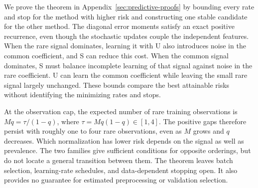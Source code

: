 We prove the theorem in Appendix~\ref{sec:predictive-proofs} by bounding every
rate and stop for the method with higher risk and constructing one stable
candidate for the other method. The diagonal error moments satisfy an exact
positive recurrence, even though the stochastic updates couple the independent
features. When the rare signal dominates, learning it with U also introduces
noise in the common coefficient, and S can reduce this cost. When the common
signal dominates, S must balance incomplete learning of that signal against
noise in the rare coefficient. U can learn the common coefficient while leaving
the small rare signal largely unchanged. These bounds compare the best
attainable risks without identifying the minimizing rates and stops.

At the observation cap, the expected number of rare training observations is
$Mq=\tau/(1-q)$, where $\tau=Mq(1-q)\in[1,4]$. The positive gaps therefore
persist with roughly one to four rare observations, even as $M$ grows and $q$
decreases. Which normalization has lower risk depends on the signal as well as
prevalence. The two families give sufficient conditions for opposite orderings,
but do not locate a general transition between them. The theorem leaves batch
selection, learning-rate schedules, and data-dependent stopping open. It also
provides no guarantee for estimated preprocessing or validation selection.
